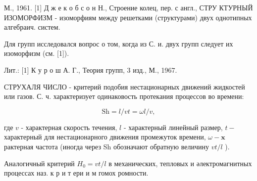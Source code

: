 \documentclass[10pt]{article}
\begin{document}
М., 1961. [1] Д ж е к о б с о н Н., Строение колец, пер. с англ., СТРУ КТУРНЫЙ ИЗОМОРФИЗМ - изоморфиям между решетками (структурами) двух однотипных алгебраич. систем.



Для групп исследовался вопрос о том, когда из С. и. двух групп следует их изоморфизм (см. [1]).



Лит.: [1] К у р о ш А. Г., Теория групп, 3 изд., М., 1967.



СТРУХАЛЯ ЧИСЛО - критерий подобия нестационарных движений жидкостей или газов. С. ч. характеризует одинаковость протекания процессов во времени:



\[

\mathrm{Sh}=l / v t=\omega l / v,

\]



где $v$ - характерная скорость течения, $l$ - характерный линейный размер, $t-$ характерный для нестационарного движения промежуток времени, $\omega-\mathbf{x}$ рактерная частота (иногда через Sh обозначают обратную величину $v t / l$ ).



Аналогичный критерий $H_{0}=v t / l$ в механических, тепловых и әлектромагнитных процессах наз. к р и т ери и м гомох ромности.
\end{document}
